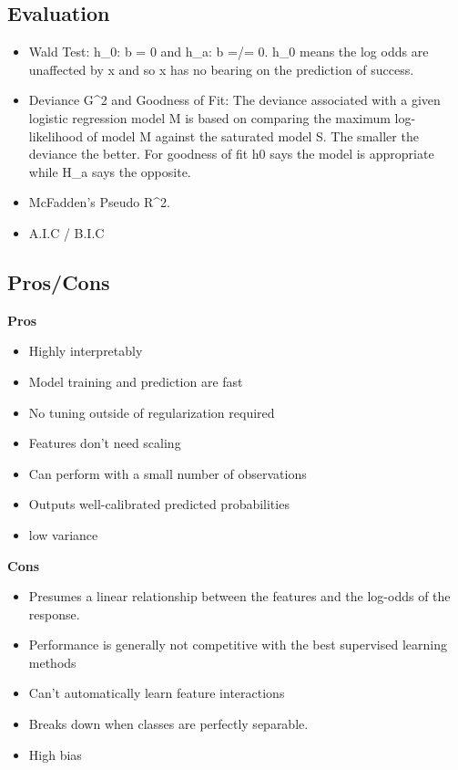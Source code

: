 \documentclass[]{book}
\theoremstyle{definition}
\theoremstyle{definition}
\theoremstyle{definition}
\theoremstyle{remark}
\begin{document}
\subsection{Evaluation}\label{evaluation-1}

\begin{itemize}
\item
  Wald Test: h\_0: b = 0 and h\_a: b =/= 0. h\_0 means the log odds are
  unaffected by x and so x has no bearing on the prediction of success.
\item
  Deviance G\^{}2 and Goodness of Fit: The deviance associated with a
  given logistic regression model M is based on comparing the maximum
  log-likelihood of model M against the saturated model S. The smaller
  the deviance the better. For goodness of fit h0 says the model is
  appropriate while H\_a says the opposite.
\item
  McFadden's Pseudo R\^{}2.
\item
  A.I.C / B.I.C
\end{itemize}

\subsection{Pros/Cons}\label{proscons-2}

\textbf{Pros}

\begin{itemize}
\item
  Highly interpretably
\item
  Model training and prediction are fast
\item
  No tuning outside of regularization required
\item
  Features don't need scaling
\item
  Can perform with a small number of observations
\item
  Outputs well-calibrated predicted probabilities
\item
  low variance
\end{itemize}

\textbf{Cons}

\begin{itemize}
\item
  Presumes a linear relationship between the features and the log-odds
  of the response.
\item
  Performance is generally not competitive with the best supervised
  learning methods
\item
  Can't automatically learn feature interactions
\item
  Breaks down when classes are perfectly separable.
\item
  High bias
\end{itemize}
\end{document}
